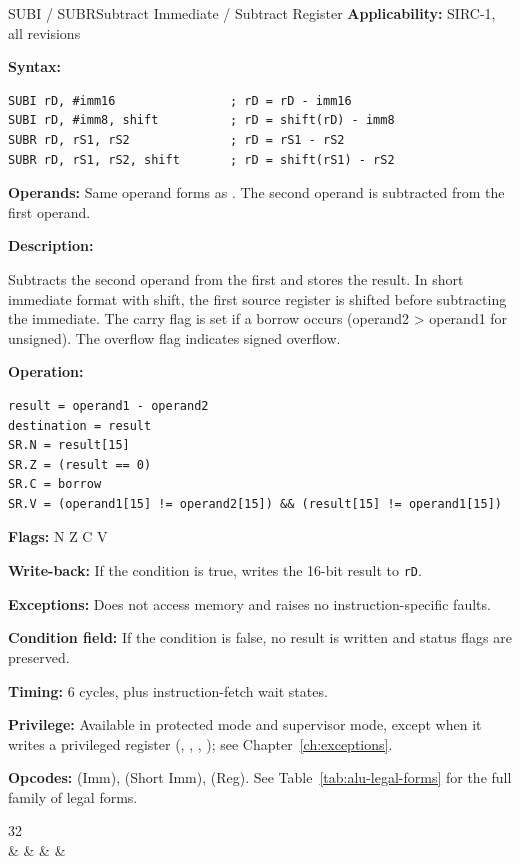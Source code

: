 \begin{instructionbox}{SUBI / SUBR}{Subtract Immediate / Subtract Register}
	\textbf{Applicability:} SIRC-1, all revisions

	\textbf{Syntax:}
	\begin{lstlisting}
SUBI rD, #imm16                ; rD = rD - imm16
SUBI rD, #imm8, shift          ; rD = shift(rD) - imm8
SUBR rD, rS1, rS2              ; rD = rS1 - rS2
SUBR rD, rS1, rS2, shift       ; rD = shift(rS1) - rS2
\end{lstlisting}

	\textbf{Operands:} Same operand forms as . The second operand is subtracted from the first operand.

	\textbf{Description:}

	Subtracts the second operand from the first and stores the result. In short immediate format with shift, the first
	source register is shifted before subtracting the immediate. The carry flag is set if a borrow occurs (operand2 >
	operand1 for unsigned). The overflow flag indicates signed overflow.

	\textbf{Operation:}
	\begin{verbatim}
result = operand1 - operand2
destination = result
SR.N = result[15]
SR.Z = (result == 0)
SR.C = borrow
SR.V = (operand1[15] != operand2[15]) && (result[15] != operand1[15])
\end{verbatim}

	\textbf{Flags:} N Z C V

	\textbf{Write-back:} If the condition is true, writes the 16-bit result to \texttt{rD}.

	\textbf{Exceptions:} Does not access memory and raises no instruction-specific faults.

	\textbf{Condition field:} If the condition is false, no result is written and status flags are preserved.

	\textbf{Timing:} 6 cycles, plus instruction-fetch wait states.

	\textbf{Privilege:} Available in protected mode and supervisor mode, except when it writes a
	privileged register (, , , ); see Chapter~\ref{ch:exceptions}.

	\textbf{Opcodes:}  (Imm),  (Short Imm),  (Reg). See Table~\ref{tab:alu-legal-forms} for the full family of legal forms.

	\begin{center}
		\begin{bytefield}[bitwidth=1.1em]{32}
			 \\
			 &
			 &
			 &
			 &
		\end{bytefield}
	\end{center}


\end{instructionbox}
